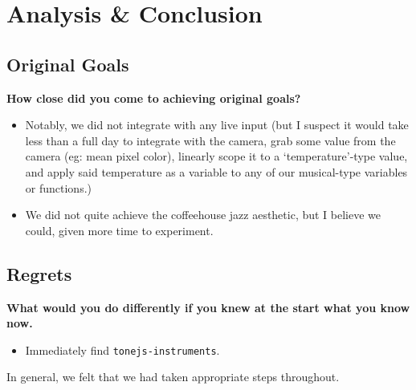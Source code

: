 \documentclass[12pt,a4paper]{article}
\newcommand{\lightcode}[1]{\colorbox{light-gray}{\texttt{#1}}}
\begin{document}
\section{Analysis \& Conclusion}
\subsection{Original Goals}
\textbf{How close did you come to achieving original goals?}
\begin{itemize}
	\item Notably, we did not integrate with any live input (but I suspect it would take less than a full day to integrate with the camera, grab some value from the camera (eg: mean pixel color), linearly scope it to a `temperature'-type value, and apply said temperature as a variable to any of our musical-type variables or functions.)
	\item We did not quite achieve the coffeehouse jazz aesthetic, but I believe we could, given more time to experiment.
\end{itemize}

\subsection{Regrets}
\textbf{What would you do differently if you knew at the start what you know now.}
\begin{itemize}
	\item Immediately find \lightcode{tonejs-instruments}.
\end{itemize}

In general, we felt that we had taken appropriate steps throughout.
\end{document}
